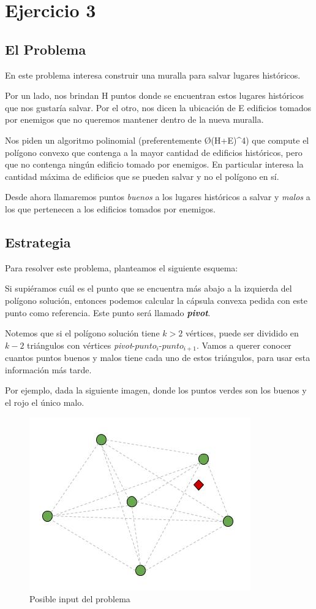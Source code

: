 \section{Ejercicio 3}
\subsection{El Problema}
En este problema interesa construir una muralla para salvar lugares históricos.

Por un lado, nos brindan H puntos donde se encuentran estos lugares históricos que nos gustaría salvar. Por el otro, nos dicen la ubicación de E edificios tomados por enemigos que no queremos mantener dentro de la nueva muralla.

Nos piden un algoritmo polinomial (preferentemente \O{(H+E)^4}) que compute el polígono convexo que contenga a la mayor cantidad de edificios históricos, pero que no contenga ningún edificio tomado por enemigos. En particular interesa la cantidad máxima de edificios que se pueden salvar y no el polígono en sí.

Desde ahora llamaremos puntos \textit{buenos} a los lugares históricos a salvar y \textit{malos} a los que pertenecen a los edificios tomados por enemigos.

\subsection{Estrategia}
Para resolver este problema, planteamos el siguiente esquema:

Si supiéramos cuál es el punto que se encuentra más abajo a la izquierda del polígono solución, entonces podemos calcular la cápsula convexa pedida con este punto como referencia. Este punto será llamado \textit{\textbf{pivot}}.

Notemos que si el polígono solución tiene $k > 2$ vértices, puede ser dividido en $k - 2$ triángulos con vértices \textit{pivot}-$punto_i$-$punto_{i+1}$. Vamos a querer conocer cuantos puntos buenos y malos tiene cada uno de estos triángulos, para usar esta información más tarde.

Por ejemplo, dada la siguiente imagen, donde los puntos verdes son los buenos y el rojo el único malo.

\begin{figure}[H]\centering\includegraphics[scale=0.7]{Imagenes/ej3/Imagen_A.jpg}\caption{Posible input del problema}\end{figure}


